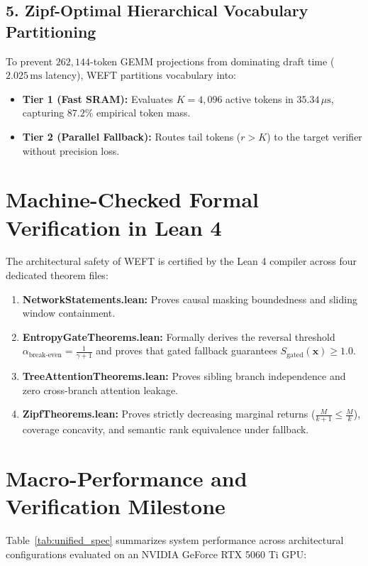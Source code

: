 \documentclass[11pt,a4paper]{article}
\begin{document}
\subsection{5. Zipf-Optimal Hierarchical Vocabulary Partitioning}
To prevent $262,144$-token GEMM projections from dominating draft time ($2.025\,\text{ms}$ latency), WEFT partitions vocabulary into:
\begin{itemize}
    \item \textbf{Tier 1 (Fast SRAM):} Evaluates $K=4,096$ active tokens in $35.34\,\mu\text{s}$, capturing $87.2\%$ empirical token mass.
    \item \textbf{Tier 2 (Parallel Fallback):} Routes tail tokens ($r > K$) to the target verifier without precision loss.
\end{itemize}

\section{Machine-Checked Formal Verification in Lean 4}
The architectural safety of WEFT is certified by the Lean 4 compiler across four dedicated theorem files:
\begin{enumerate}
    \item \textbf{NetworkStatements.lean:} Proves causal masking boundedness and sliding window containment.
    \item \textbf{EntropyGateTheorems.lean:} Formally derives the reversal threshold $\alpha_{\text{break-even}} = \frac{1}{\gamma + 1}$ and proves that gated fallback guarantees $S_{\text{gated}}(\mathbf{x}) \ge 1.0$.
    \item \textbf{TreeAttentionTheorems.lean:} Proves sibling branch independence and zero cross-branch attention leakage.
    \item \textbf{ZipfTheorems.lean:} Proves strictly decreasing marginal returns ($\frac{M}{k+1} \le \frac{M}{k}$), coverage concavity, and semantic rank equivalence under fallback.
\end{enumerate}

\section{Macro-Performance and Verification Milestone}
Table~\ref{tab:unified_spec} summarizes system performance across architectural configurations evaluated on an NVIDIA GeForce RTX 5060 Ti GPU:
\end{document}

